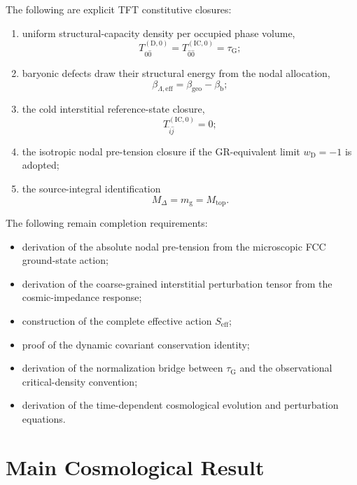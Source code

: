 The following are explicit TFT constitutive closures:
\begin{enumerate}
    \item uniform structural-capacity density per occupied phase volume,
    \begin{equation}
        T_{\hat{0}\hat{0}}^{(\mathrm{D},0)} = T_{\hat{0}\hat{0}}^{(\mathrm{IC},0)} = \tau_{\mathrm{G}};
    \end{equation}
    \item baryonic defects draw their structural energy from the nodal allocation,
    \begin{equation}
        \beta_{\Lambda,\mathrm{eff}} = \beta_{\mathrm{geo}}-\beta_{\mathrm{b}};
    \end{equation}
    \item the cold interstitial reference-state closure,
    \begin{equation}
        T_{\hat{i}\hat{j}}^{(\mathrm{IC},0)}=0;
    \end{equation}
    \item the isotropic nodal pre-tension closure if the GR-equivalent limit $w_{\mathrm{D}}=-1$ is adopted;
    \item the source-integral identification
    \begin{equation}
        M_{\Delta} = m_{\mathrm{g}} = M_{\mathrm{top}}.
    \end{equation}
\end{enumerate}

The following remain completion requirements:
\begin{itemize}
    \item derivation of the absolute nodal pre-tension from the microscopic FCC ground-state action;
    \item derivation of the coarse-grained interstitial perturbation tensor from the cosmic-impedance response;
    \item construction of the complete effective action $S_{\mathrm{eff}}$;
    \item proof of the dynamic covariant conservation identity;
    \item derivation of the normalization bridge between $\tau_{\mathrm{G}}$ and the observational critical-density convention;
    \item derivation of the time-dependent cosmological evolution and perturbation equations.
\end{itemize}

\section{Main Cosmological Result}

